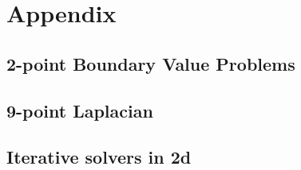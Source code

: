 \documentclass[12pt, a4paper, titlepage]{article} %
\begin{document}
% 

%


\tableofcontents
\newpage






% 

\clearpage
\appendix
\section{Appendix}
\subsection{2-point Boundary Value Problems}






\subsection{9-point Laplacian}





\subsection{Iterative solvers in 2d}











\end{document}
